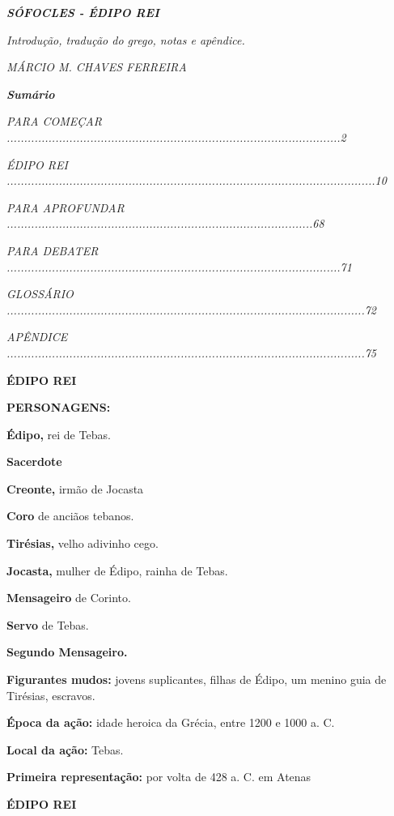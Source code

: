 
\emph{\textbf{SÓFOCLES - ÉDIPO REI}}

\emph{Introdução, tradução do grego, notas e apêndice.}

\emph{MÁRCIO M. CHAVES FERREIRA}

\emph{\textbf{Sumário}}

\emph{PARA COMEÇAR
................................................................................................2}

\emph{ÉDIPO REI
..........................................................................................................10}

\emph{PARA APROFUNDAR
........................................................................................68}

\emph{PARA DEBATER
................................................................................................71}

\emph{GLOSSÁRIO
.......................................................................................................72}

\emph{APÊNDICE
.......................................................................................................75}


\textbf{ÉDIPO REI}

\textbf{PERSONAGENS:}

\textbf{Édipo,} rei de Tebas.

\textbf{Sacerdote}

\textbf{Creonte,} irmão de Jocasta

\textbf{Coro} de anciãos tebanos.

\textbf{Tirésias,} velho adivinho cego.

\textbf{Jocasta,} mulher de Édipo, rainha de Tebas.

\textbf{Mensageiro} de Corinto.

\textbf{Servo} de Tebas.

\textbf{Segundo Mensageiro. }

\textbf{Figurantes mudos:} jovens suplicantes, filhas de Édipo, um
menino guia de Tirésias, escravos.

\textbf{Época da ação:} idade heroica da Grécia, entre 1200 e 1000 a. C.

\textbf{Local da ação:} Tebas.

\textbf{Primeira representação:} por volta de 428 a. C. em Atenas

\textbf{ÉDIPO REI}

